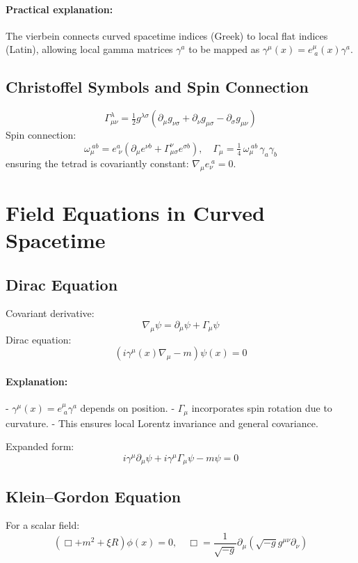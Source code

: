 \documentclass[12pt,a4paper]{article}
\begin{document}
\paragraph{Practical explanation:} The vierbein connects curved spacetime indices (Greek) to local flat indices (Latin), allowing local gamma matrices \(\gamma^a\) to be mapped as \(\gamma^\mu(x)=e^\mu_{\;a}(x)\gamma^a\).

\subsection{Christoffel Symbols and Spin Connection}
\[
\Gamma^\lambda_{\mu\nu}=\tfrac{1}{2} g^{\lambda\sigma}(\partial_\mu g_{\nu\sigma}+\partial_\nu g_{\mu\sigma}-\partial_\sigma g_{\mu\nu})
\]
Spin connection:
\[
\omega_{\mu}^{\;ab}=e^{a}_{\;\nu}(\partial_\mu e^{\nu b}+\Gamma^\nu_{\mu\sigma} e^{\sigma b}),\quad
\Gamma_\mu=\tfrac{1}{4}\,\omega_{\mu}^{\;ab}\,\gamma_a\gamma_b
\]
ensuring the tetrad is covariantly constant: \(\nabla_\mu e_\nu^{\;a}=0\).

\section{Field Equations in Curved Spacetime}
\subsection{Dirac Equation}
Covariant derivative:
\[
\nabla_\mu\psi=\partial_\mu\psi+\Gamma_\mu\psi
\]
Dirac equation:
\begin{equation}\label{eq:dirac_cov}
(i\gamma^\mu(x)\nabla_\mu - m)\psi(x)=0
\end{equation}

\paragraph{Explanation:}  
- \(\gamma^\mu(x)=e^\mu_{\;a}\gamma^a\) depends on position.  
- \(\Gamma_\mu\) incorporates spin rotation due to curvature.  
- This ensures local Lorentz invariance and general covariance.

Expanded form:
\[
i\gamma^\mu\partial_\mu\psi + i\gamma^\mu\Gamma_\mu\psi - m\psi = 0
\]

\subsection{Klein--Gordon Equation}
For a scalar field:
\begin{equation}\label{eq:kg_curved}
(\Box + m^2 + \xi R)\phi(x) = 0, \quad
\Box=\frac{1}{\sqrt{-g}}\partial_\mu(\sqrt{-g}g^{\mu\nu}\partial_\nu)
\end{equation}
\end{document}
